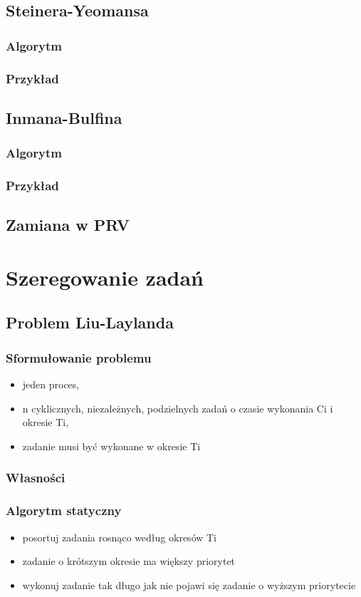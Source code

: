 \documentclass[12pt,a4paper]{article}
\begin{document}
\subsection{Steinera-Yeomansa}
\subsubsection{Algorytm}
\subsubsection{Przykład}
\subsection{Inmana-Bulfina}
\subsubsection{Algorytm}
\subsubsection{Przykład}
\subsection{Zamiana w PRV}
\section{Szeregowanie zadań}
\subsection{Problem Liu-Laylanda}
\subsubsection{Sformułowanie problemu}
\begin{itemize}
\item jeden proces,
\item n cyklicznych, niezależnych, podzielnych zadań o czasie wykonania Ci i okresie Ti,
\item zadanie musi być wykonane w okresie Ti
\end{itemize}
\subsubsection{Własności}
\subsubsection{Algorytm statyczny}
\begin{itemize}
\item posortuj zadania rosnąco według okresów Ti
\item zadanie o krótszym okresie ma większy priorytet
\item wykonuj zadanie tak długo jak nie pojawi się zadanie o wyższym priorytecie
\end{itemize}
\end{document}
